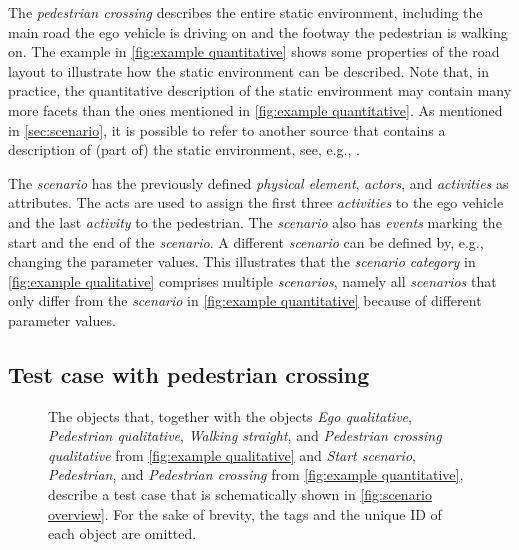 The \textit{pedestrian crossing} describes \cstartd the entire static environment, including \cendd the main road the ego vehicle is driving on and the footway the pedestrian is walking on. The example in \cref{fig:example quantitative} shows some properties of the road layout to illustrate how the static environment can be described. Note that, in practice, the quantitative description of the static environment may contain many more facets than the ones mentioned in \cref{fig:example quantitative}. As mentioned in \cref{sec:scenario}, it is possible to refer to another source that contains a description of (part of) the static environment, see, e.g., \autocite{dupuis2010opendrive}. 

The \textit{scenario} has the previously defined \cstartc\textit{physical element}\cendc, \textit{actors}, and \textit{activities} as attributes. The acts are used to assign the first three \textit{activities} to the ego vehicle and the last \textit{activity} to the pedestrian. 
The \textit{scenario} also has \cstartb \textit{events} marking the start and the end of the \textit{scenario}\cendb.
A different \textit{scenario} can be defined by, e.g., changing the parameter values. This illustrates that the \textit{scenario category} in \cref{fig:example qualitative} comprises multiple \textit{scenarios}, namely all \textit{scenarios} that only differ from the \textit{scenario} in \cref{fig:example quantitative} because of different parameter values.



\subsection{Test case with pedestrian crossing}
\label{sec:example test case}


\begin{figure*}[t]
	\centering
	
	\caption{The objects that, together with the objects \emph{Ego qualitative}, \emph{Pedestrian qualitative}, \emph{Walking straight}, and \emph{Pedestrian crossing qualitative} from \cref{fig:example qualitative} and \emph{Start scenario}, \emph{Pedestrian}, and \emph{Pedestrian crossing} from \cref{fig:example quantitative}, describe a test case that is schematically shown in \cref{fig:scenario overview}. For the sake of brevity, the tags and the unique ID of each object are omitted.}
	\label{fig:example test case}
\end{figure*}


